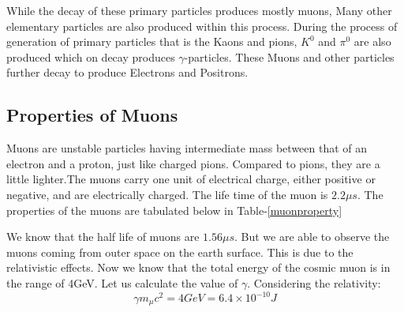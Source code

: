 \documentclass{article}
\begin{document}
\begin{multicols}{2}
While the decay of these primary particles produces mostly muons, Many other elementary particles are also produced
within this process. During the process of generation of primary particles that is the Kaons and pions, $K^0$ and $\pi^0$ are also produced
which on decay produces $\gamma$-particles. These Muons and other particles further decay to produce Electrons and Positrons.


\subsection{Properties of Muons}

Muons are unstable particles having intermediate mass between that of an 
electron and a proton, just like charged pions. Compared to pions, they are 
a little lighter.The muons carry one unit of electrical charge, either positive 
or negative, and are electrically charged. The life time of the muon is $2.2\mu s$.
The properties of the muons are tabulated below in Table-\ref{muonproperty}

\begin{table}[H]
    \centering
    \caption{Properties of Muons}
    \label{muonproperty}
\end{table}

We know that the half life of muons are $1.56\mu s$. But we are able to observe 
the muons coming from outer space on the earth surface. This is due to the relativistic
effects. Now we know that the total energy of the cosmic muon is in the range of 4GeV.
Let us calculate the value of $\gamma$. Considering the relativity:
\begin{equation}
    \gamma m_{\mu} c^2 =4GeV = 6.4\times10^{-10} J
\end{equation}


\end{multicols}
\end{document}
